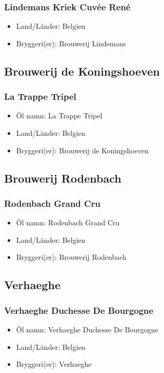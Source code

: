 \documentclass[11pt]{article}
\begin{document}
\subsubsection{Lindemans Kriek Cuvée René}
\label{sec:org112b978}
\begin{itemize}
\item Land/Länder: Belgien
\item Bryggeri(er): Brouwerij Lindemans
\end{itemize}
\subsection{Brouwerij de Koningshoeven}
\label{sec:orgaa46b26}
\subsubsection{La Trappe Tripel}
\label{sec:org15053e2}
\begin{itemize}
\item Öl namn: La Trappe Tripel
\item Land/Länder: Belgien
\item Bryggeri(er): Brouwerij de Koningshoeven
\end{itemize}
\subsection{Brouwerij Rodenbach}
\label{sec:org2ebc95d}
\subsubsection{Rodenbach Grand Cru}
\label{sec:org2e57a83}
\begin{itemize}
\item Öl namn: Rodenbach Grand Cru
\item Land/Länder: Belgien
\item Bryggeri(er): Brouwerij Rodenbach
\end{itemize}
\subsection{Verhaeghe}
\label{sec:org9feca22}
\subsubsection{Verhaeghe Duchesse De Bourgogne}
\label{sec:orgf66d553}
\begin{itemize}
\item Öl namn: Verhaeghe Duchesse De Bourgogne
\item Land/Länder: Belgien
\item Bryggeri(er): Verhaeghe
\end{itemize}
\end{document}
